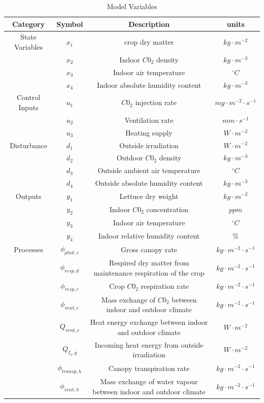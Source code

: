 \begin{table}[H]
	\begin{center}
		\begin{tabular}{|c|c|c|c|}
			\hline
			Category & Symbol & Description & units 
			\\ \hline
			State Variables & $x_1$& crop dry matter& $kg \cdot m^{-2}$
			\\
			& $x_{2}$& Indoor $C0_2$ density& $kg \cdot m^{-3}$
			\\
			& $x_{3}$& Indoor air temperature& $^{\circ}C$
			\\
			& $x_{4}$& Indoor absolute humidity content& $kg \cdot m^{-3}$
			\\ \hline
			Control Inputs & $u_{1}$& $C0_2$ injection rate& $mg \cdot m^{-2} \cdot s^{-1}$
			\\
			& $u_{2}$& Ventilation rate& $mm \cdot s^{-1}$
			\\
			& $u_{3}$& Heating supply& $ W \cdot m^{-2}$
			\\ \hline
			Disturbance     & $d_{1}$& Outside irradiation & $ W \cdot m^{-2}$
			\\
			& $d_{2}$& Outdoor $C0_2$ density& $kg \cdot m^{-3}$
			\\
			& $d_{3}$& Outside ambient air temperature& $^{\circ}C$
			\\
			& $d_{4}$& Outside absolute humidity content& $kg \cdot m^{-3}$
			\\ \hline
			Outputs        & $y_1$& Lettuce dry weight& $kg \cdot m^{-2}$
			\\
			& $y_{2}$& Indoor $C0_2$ concentration& $ppm$
			\\
			& $y_{3}$& Indoor air temperature& $^{\circ}C$
			\\
			& $y_{4}$& Indoor relative humidity content& $\%$
			\\ \hline
			Processes       & $\phi_{phot,c}$& Gross canopy rate& $kg \cdot m^{-2} \cdot s^{-1}$
			\\
			& $\phi_{resp,d}$&Respired dry matter from maintenance respiration of the crop& $kg \cdot m^{-2} \cdot s^{-1}$
			\\
			& $\phi_{resp,c}$& Crop $C0_2$ respiration rate & $kg \cdot m^{-2} \cdot s^{-1}$
			\\
			& $\phi_{vent,c}$& Mass exchange of $C0_2$ between indoor and outdoor climate & $kg \cdot m^{-2} \cdot s^{-1}$
			\\
			& $Q_{vent,c}$& Heat energy exchange  between indoor and outdoor climate & $W \cdot m^{-2}$
			\\
			& $Q_{I_o,q}$& Incoming heat energy from outside irradiation & $W \cdot m^{-2}$
			\\
			& $\phi_{transp,h}$& Canopy transpiration rate & $kg \cdot m^{-2} \cdot s^{-1}$
			\\
			& $\phi_{vent,h}$& Mass exchange of water vapour between indoor and outdoor climate & $kg \cdot m^{-2} \cdot s^{-1}$
			\\ \hline
			
			
		\end{tabular}
	\end{center}
	\caption{Model Variables}
	\label{tab:model variables and descriptions}
\end{table}

